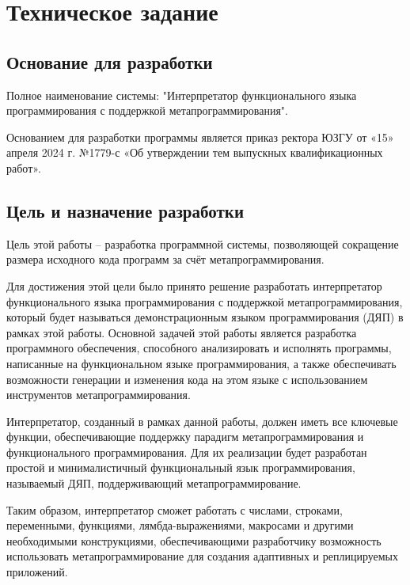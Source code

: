 \section{Техническое задание}
\subsection{Основание для разработки}

Полное наименование системы: "Интерпретатор функционального языка программирования с поддержкой метапрограммирования".

Основанием для разработки программы является приказ ректора ЮЗГУ от «15» апреля 2024 г. №1779-с «Об утверждении тем выпускных квалификационных работ».

\subsection{Цель и назначение разработки}

Цель этой работы -- разработка программной системы, позволяющей сокращение размера исходного кода программ за счёт метапрограммирования.

Для достижения этой цели было принято решение разработать интерпретатор функционального языка программирования с поддержкой метапрограммирования, который будет называться демонстрационным языком программирования (ДЯП) в рамках этой работы. Основной задачей этой работы является разработка программного обеспечения, способного анализировать и исполнять программы, написанные на функциональном языке программирования, а также обеспечивать возможности генерации и изменения кода на этом языке с использованием инструментов метапрограммирования.

Интерпретатор, созданный в рамках данной работы, должен иметь все ключевые функции, обеспечивающие поддержку парадигм метапрограммирования и функционального программирования. Для их реализации будет разработан простой и минималистичный функциональный язык программирования, называемый ДЯП, поддерживающий метапрограммирование. 

Таким образом, интерпретатор сможет работать с  числами, строками, переменными, функциями, лямбда-выражениями, макросами и другими необходимыми конструкциями, обеспечивающими разработчику возможность использовать метапрограммирование для создания адаптивных и реплицируемых приложений.

